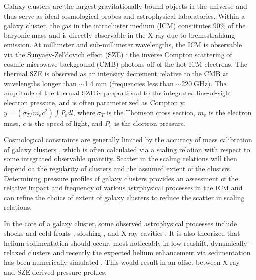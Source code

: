 \documentclass[iop,numberedappendix,apj]{emulateapj}
\begin{document}
Galaxy clusters are the largest gravitationally bound objects in the universe and thus serve as ideal cosmological probes 
and astrophysical laboratories. Within a galaxy cluster, the gas in the intracluster medium (ICM) constitutes 90\% of the
baryonic mass \citep{vikhlinin2006b} and is directly observable in the X-ray due to bremsstrahlung emission. 
At millimeter and sub-millimeter wavelengths, the ICM is observable via the Sunyaev-Zel'dovich effect (SZE) 
\citep{sunyaev1972}: the inverse Compton scattering of cosmic microwave background (CMB) photons off of
the hot ICM electrons. The thermal SZE is observed as an intensity decrement relative to the CMB at wavelengths longer 
than $\sim$1.4 mm (frequencies less than $\sim$220 GHz). The amplitude of the thermal SZE is proportional to the integrated
line-of-sight electron pressure, and is often parameterized as Compton y: $y = (\sigma_T / m_e c^2) \int P_e dl$, where
$\sigma_T$ is the Thomson cross section, $m_e$ is the electron mass, $c$ is the speed of light, and $P_e$ is the electron
pressure.

Cosmological constraints are generally limited by the accuracy of mass calibration of galaxy clusters 
\citep[e.g.][]{hasselfield2013, reichardt2013}, which is often calculated via a scaling relation with respect to some 
integrated observable quantity. Scatter in the scaling relations will then depend on the regularity of
clusters and the assumed extent of the clusters. Determining pressure profiles of galaxy clusters provides an assessment of 
the relative impact and frequency of various astrphysical processes in the ICM and can refine the choice of extent of 
galaxy clusters to reduce the scatter in scaling relations.

In the core of a galaxy cluster, some observed astrophysical processes include shocks and cold fronts 
\citep[e.g.][]{markevitch2007}, sloshing \citep[e.g.][]{fabian2006}, and X-ray cavities \citep{mcnamara2007}. 
It is also theorized that helium sedimentation should occur, most noticeably in low redshift, dynamically-relaxed 
clusters \citep{abramopoulos1981, gilfanov1984} 
and recently the expected helium enhancement via sedimentation has been numerically simulated \citep{peng2009}. 
This would result in an offset between X-ray and SZE derived pressure profiles.
\end{document}
